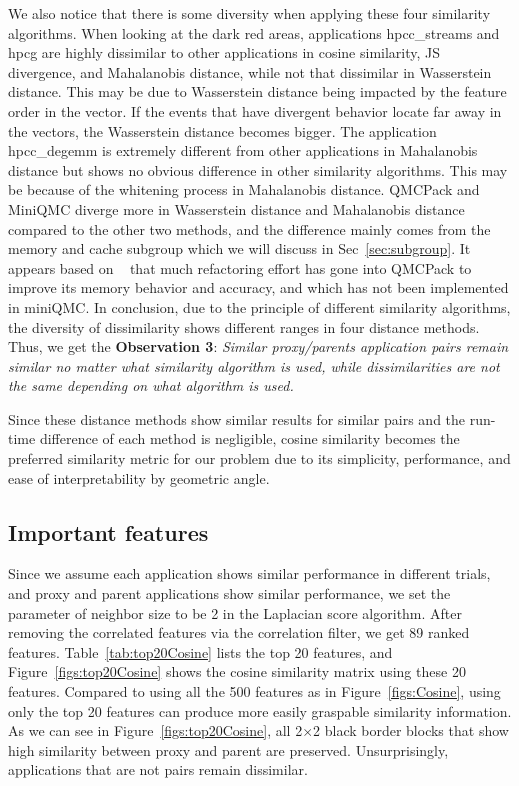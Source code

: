 We also notice that there is some diversity when applying these four similarity algorithms. When looking at the dark red areas, applications hpcc\_streams and hpcg are highly dissimilar to other applications in cosine similarity, JS divergence, and Mahalanobis distance, while not that dissimilar in Wasserstein distance. This may be due to Wasserstein distance being impacted by the feature order in the vector. If the events that have divergent behavior locate far away in the vectors, the Wasserstein distance becomes bigger. The application hpcc\_degemm is extremely different from other applications in Mahalanobis distance but shows no obvious difference in other similarity algorithms. This may be because of the whitening process in Mahalanobis distance. QMCPack and MiniQMC diverge more in Wasserstein distance and Mahalanobis distance compared to the other two methods, and the difference mainly comes from the memory and cache subgroup which we will discuss in Sec~\ref{sec:subgroup}. It appears based on ~\cite{qmcpack} that much refactoring effort has gone into QMCPack to improve its memory
behavior and accuracy, and which has not been implemented in miniQMC. In conclusion, due to the principle of different similarity algorithms, the diversity of dissimilarity shows different ranges in four distance methods. Thus, we get the \textbf{Observation 3}: \textit{Similar proxy/parents application pairs remain similar no matter what similarity algorithm is used, while dissimilarities are not the same depending on what algorithm is used.}

Since these distance methods show similar results for similar pairs and the run-time difference of each method is negligible, cosine similarity becomes the preferred similarity metric for our problem due to its simplicity, performance, and ease of interpretability by geometric angle.

\subsection{Important features}
Since we assume each application shows similar performance in different trials, and proxy and parent applications show similar performance, we set the parameter of neighbor size to be 2 in the Laplacian score algorithm. After removing the correlated features via the correlation filter, we get 89 ranked features. Table~\ref{tab:top20Cosine} lists the top 20 features, and Figure~\ref{figs:top20Cosine}  shows the cosine similarity matrix using these 20 features. Compared to using all the 500 features as in Figure~\ref{figs:Cosine}, using only the top 20 features can produce more easily graspable similarity information. As we can see in Figure~\ref{figs:top20Cosine}, all 2$\times$2 black border blocks that show high similarity between proxy and parent are preserved. Unsurprisingly, applications that are not pairs remain dissimilar.%

